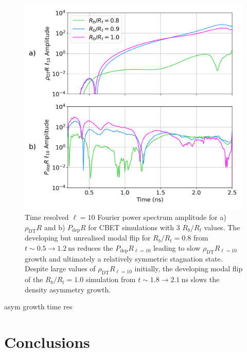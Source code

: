 \begin{figure}[t!]
    \includegraphics[width=0.75\linewidth]{Results1/Images/RbRts_mode10_growth.png}
    \centering
    \caption{Time resolved $\ell=10$ Fourier power spectrum amplitude for a) $\rho_{\text{DT}}R$ and b) $P_{\text{dep}}R$ for \ac{CBET} simulations with 3 $R_b/R_t$ values.
    The developing but unrealised modal flip for $R_b/R_t=0.8$ from $t \sim 0.5\rightarrow 1.2\ \text{ns}$ reduces the $P_{\text{dep}}R_{\ell=10}$ leading to slow $\rho_{\text{DT}}R_{\ell=10}$ growth and ultimately a relatively symmetric stagnation state.
    Despite large values of $\rho_{\text{DT}}R_{\ell=10}$ initially, the developing modal flip of the $R_b/R_t=1.0$ simulation from $t \sim 1.8\rightarrow 2.1\ \text{ns}$ slows the density asymmetry growth.}%
    \label{fig:Res1_mode10_growths}
\end{figure}

asym growth time res


\section{Conclusions}%
\label{sec:Res1_Conclusions}

